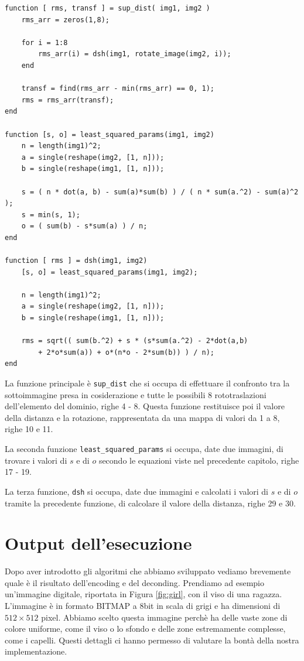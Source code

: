 \documentclass[11pt,a4paper,appendixprefix=true,numbers=noenddot]{scrreprt}
\begin{document}
\begin{verbatim}
function [ rms, transf ] = sup_dist( img1, img2 )
    rms_arr = zeros(1,8);

    for i = 1:8
        rms_arr(i) = dsh(img1, rotate_image(img2, i));
    end

    transf = find(rms_arr - min(rms_arr) == 0, 1);
    rms = rms_arr(transf);
end

function [s, o] = least_squared_params(img1, img2)
    n = length(img1)^2;
    a = single(reshape(img2, [1, n]));
    b = single(reshape(img1, [1, n]));

    s = ( n * dot(a, b) - sum(a)*sum(b) ) / ( n * sum(a.^2) - sum(a)^2 );
    s = min(s, 1);
    o = ( sum(b) - s*sum(a) ) / n;
end

function [ rms ] = dsh(img1, img2)
    [s, o] = least_squared_params(img1, img2);

    n = length(img1)^2;
    a = single(reshape(img2, [1, n]));
    b = single(reshape(img1, [1, n]));

    rms = sqrt(( sum(b.^2) + s * (s*sum(a.^2) - 2*dot(a,b) 
        + 2*o*sum(a)) + o*(n*o - 2*sum(b)) ) / n);
end
\end{verbatim}

La funzione principale è \texttt{sup\_dist} che si occupa di effettuare il confronto tra la sottoimmagine presa in cosiderazione e tutte le possibili 8 rototraslazioni dell'elemento del dominio, righe 4 - 8. Questa funzione restituisce poi il valore della distanza e la rotazione, rappresentata da una mappa di valori da 1 a 8, righe 10 e 11.

La seconda funzione \texttt{least\_squared\_params} si occupa, date due immagini, di trovare i valori di $s$ e di $o$ secondo le equazioni viste nel precedente capitolo, righe 17 - 19.

La terza funzione, \texttt{dsh} si occupa, date due immagini e calcolati i valori di $s$ e di $o$ tramite la precedente funzione, di calcolare il valore della distanza, righe 29 e 30.

\section{Output dell'esecuzione}

Dopo aver introdotto gli algoritmi che abbiamo sviluppato vediamo brevemente quale è il risultato dell'encoding e del deconding. Prendiamo ad esempio un'immagine digitale, riportata in Figura \ref{fig:girl}, con il viso di una ragazza. L'immagine è in formato BITMAP a 8bit in scala di grigi e ha dimensioni di $512 \times 512$ pixel. Abbiamo scelto questa immagine perchè ha delle vaste zone di colore uniforme, come il viso o lo sfondo e delle zone estremamente complesse, come i capelli. Questi dettagli ci hanno permesso di valutare la bontà della nostra implementazione.
\end{document}
